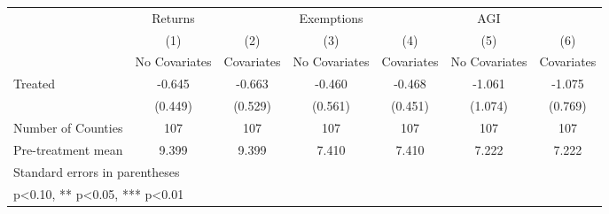 {
\def\sym#1{\ifmmode^{#1}\else\(^{#1}\)\fi}
\begin{tabular}{l*{6}{c}}
\hline\hline
            &     Returns   &               &  Exemptions   &               &         AGI   &               \\
            &\multicolumn{1}{c}{(1)}&\multicolumn{1}{c}{(2)}&\multicolumn{1}{c}{(3)}&\multicolumn{1}{c}{(4)}&\multicolumn{1}{c}{(5)}&\multicolumn{1}{c}{(6)}\\
            &\multicolumn{1}{c}{No Covariates}&\multicolumn{1}{c}{Covariates}&\multicolumn{1}{c}{No Covariates}&\multicolumn{1}{c}{Covariates}&\multicolumn{1}{c}{No Covariates}&\multicolumn{1}{c}{Covariates}\\
\hline
Treated     &      -0.645   &      -0.663   &      -0.460   &      -0.468   &      -1.061   &      -1.075   \\
            &     (0.449)   &     (0.529)   &     (0.561)   &     (0.451)   &     (1.074)   &     (0.769)   \\
\hline
Number of Counties&         107   &         107   &         107   &         107   &         107   &         107   \\
Pre-treatment mean&       9.399   &       9.399   &       7.410   &       7.410   &       7.222   &       7.222   \\
\hline\hline
\multicolumn{7}{l}{\footnotesize Standard errors in parentheses}\\
\multicolumn{7}{l}{\footnotesize * p<0.10, ** p<0.05, *** p<0.01}\\
\end{tabular}
}
